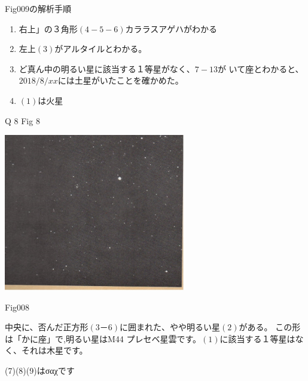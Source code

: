\documentclass{jarticle}
\begin{document}
Fig009の解析手順
\begin{enumerate}
  \setlength{\parskip}{0cm} %
  \setlength{\itemsep}{0cm} %
\item {右上」の３角形$(4-5-6)$カララスアゲハがわかる
}
\item 左上$(3)$がアルタイルとわかる。
\item ど真ん中の明るい星に該当する１等星がなく、$7-13$が
いて座とわかると、$2018/8/xx$には土星がいたことを確かめた。
\item $(1)$は火星
\end{enumerate}
\vspace{1cm}

Q 8 Fig 8\\

\begin{minipage}{5cm}
\includegraphics[width=8cm, clip]{fig008a.jpg}
\begin{center}
Fig008
\end{center}
\end{minipage}
\vspace{0.5cm}


中央に、否んだ正方形$(3－6)$に囲まれた、やや明るい星$(2)$がある。
この形は「かに座」で,明るい星はM44
 プレセベ星雲です。$(1)$に該当する１等星はなく、それは木星です。
 
 (7)(8)(9)はσαχです


\newpage
\begin{minipage}{9cm}
 \setlength{}  
\end{minipage}
\end{document}
